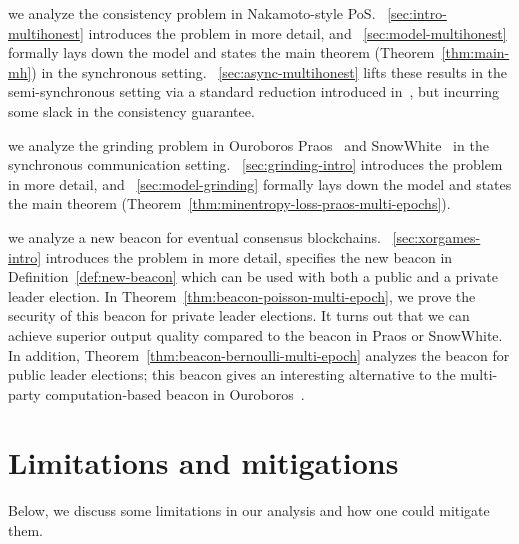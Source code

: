 \begin{description}[font=\normalfont\ ]
  \item[In Part~\ref{part:multihonest},]
    we analyze the consistency problem in Nakamoto-style PoS.
    \Section~\ref{sec:intro-multihonest} introduces the problem in more detail, 
    and \Section~\ref{sec:model-multihonest} formally lays down the model and 
    states the main theorem (Theorem~\ref{thm:main-mh}) in the synchronous setting.
    \Section~\ref{sec:async-multihonest} lifts these results in the semi-synchronous setting 
    via a standard reduction introduced in~\cite{Praos}, 
    but incurring some slack in the consistency guarantee. 
  
  \item[In Part~\ref{part:praos},]
    we analyze the grinding problem in Ouroboros Praos~\cite{Praos} and SnowWhite~\cite{SnowWhite} 
    in the synchronous communication setting.
    \Section~\ref{sec:grinding-intro} introduces the problem in more detail, 
    and \Section~\ref{sec:model-grinding} formally lays down the model and 
    states the main theorem (Theorem~\ref{thm:minentropy-loss-praos-multi-epochs}). 

  \item[In Part~\ref{part:xorgames},]
    we analyze a new beacon for eventual consensus blockchains. 
    \Section~\ref{sec:xorgames-intro} introduces the problem in more detail, 
    specifies the new beacon in Definition~\ref{def:new-beacon} which can be used with both a public and a private leader election.
    In Theorem~\ref{thm:beacon-poisson-multi-epoch},  we prove the security of this beacon 
    for private leader elections. 
    It turns out that we can achieve superior output quality compared to the beacon in Praos or SnowWhite. 
    In addition, Theorem~\ref{thm:beacon-bernoulli-multi-epoch} 
    analyzes the beacon for public leader elections; 
    this beacon gives an interesting alternative to the multi-party computation-based 
    beacon in Ouroboros~\cite{Ouroboros}.
\end{description}




\section{Limitations and mitigations}
Below, we discuss some limitations in our analysis 
and how one could mitigate them.


